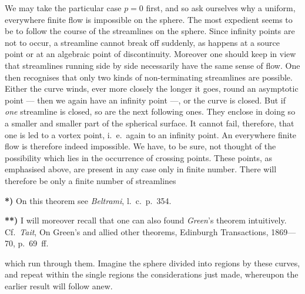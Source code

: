 \documentclass{article}
\begin{document}
We may take the particular case $p = 0$ first, and so ask ourselves why a uniform, everywhere finite flow is impossible on the sphere. The most expedient seems to be to follow the course of the streamlines on the sphere. Since infinity points are not to occur, a streamline cannot break off suddenly, as happens at a source point or at an algebraic point of discontinuity. Moreover one should keep in view that streamlines running side by side necessarily have the same sense of flow. One then recognises that only two kinds of non-terminating streamlines are possible. Either the curve winds, ever more closely the longer it goes, round an asymptotic point --- then we again have an infinity point ---, or the curve is closed. But if \emph{one} streamline is closed, so are the next following ones. They enclose in doing so a smaller and smaller part of the spherical surface. It cannot fail, therefore, that one is led to a vortex point, i.\ e.\ again to an infinity point. An everywhere finite flow is therefore indeed impossible. We have, to be sure, not thought of the possibility which lies in the occurrence of crossing points. These points, as emphasised above, are present in any case only in finite number. There will therefore be only a finite number of streamlines

\textbf{*)} On this theorem see \emph{Beltrami}, l.\ c.\ p.~354.

\textbf{**)} I will moreover recall that one can also found \emph{Green}'s theorem intuitively. Cf.\ \emph{Tait}, On Green's and allied other theorems, Edinburgh Transactions, 1869---70, p.~69~ff.

which run through them. Imagine the sphere divided into regions by these curves, and repeat within the single regions the considerations just made, whereupon the earlier result will follow anew.
\end{document}
